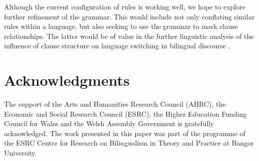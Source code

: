 \documentclass[11pt]{article}
\begin{document}
Although the current configuration of rules is working well, we hope to explore further refinement of the grammar.  This would include not only conflating similar rules within a language, but also seeking to use the grammar to mark clause relationships.  The latter would be of value in the further linguistic analysis of the influence of clause structure on language switching in bilingual discourse \cite{antonsen2010}.


\section*{Acknowledgments}

The support of the Arts and Humanities Research Council (AHRC), the Economic and Social Research Council (ESRC), the Higher Education Funding Council for Wales and the Welsh Assembly Government is gratefully acknowledged. The work presented in this paper was part of the programme of the ESRC Centre for Research on Bilingualism in Theory and Practice at Bangor University.




\end{document}
